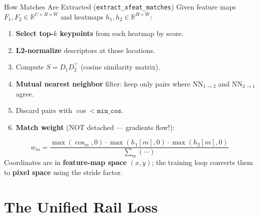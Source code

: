 \documentclass[aspectratio=169, 12pt]{beamer}
\newcommand{\R}{\mathbb{R}}
\begin{document}
\begin{frame}{How Matches Are Extracted (\texttt{extract\_xfeat\_matches})}
\small
Given feature maps $F_1, F_2 \in \R^{C \times H \times W}$ and heatmaps $h_1, h_2 \in \R^{H \times W}$:

\begin{enumerate}\setlength{\itemsep}{1pt}
    \item \textbf{Select top-$k$ keypoints} from each heatmap by score.
    \item \textbf{L2-normalize} descriptors at those locations.
    \item Compute $S = D_1 D_2^\top$ (cosine similarity matrix).
    \item \textbf{Mutual nearest neighbor} filter: keep only pairs where
          $\mathrm{NN}_{1\to 2}$ and $\mathrm{NN}_{2\to 1}$ agree.
    \item Discard pairs with $\cos < \texttt{min\_cos}$.
    \item \textbf{Match weight} (NOT detached --- gradients flow!):
\end{enumerate}
\vspace{-0.3em}
\[
    w_m = \frac{\max(\cos_m, 0) \cdot \max(h_1[m], 0) \cdot \max(h_2[m], 0)}
               {\sum_m (\cdots)}
\]
\vspace{-0.5em}
Coordinates are in \textbf{feature-map space} $(x, y)$;
the training loop converts them to \textbf{pixel space} using the stride factor.
\end{frame}

\section{The Unified Rail Loss}
\end{document}
